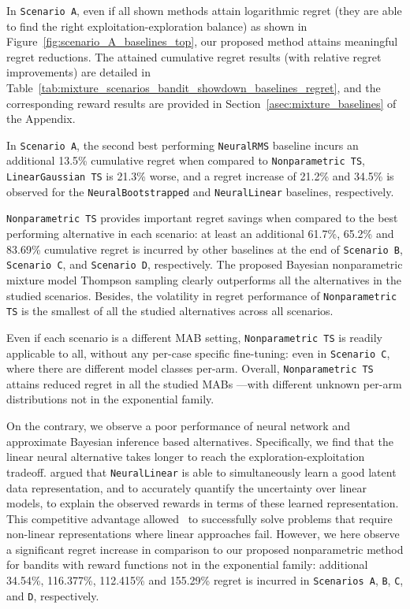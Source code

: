 In \texttt{Scenario A}, even if all shown methods attain logarithmic regret (\ie they are able to find the right exploitation-exploration balance) as shown in Figure~\ref{fig:scenario_A_baselines_top}, our proposed method attains meaningful regret reductions.
The attained cumulative regret results (with relative regret improvements) are detailed in Table~\ref{tab:mixture_scenarios_bandit_showdown_baselines_regret}, and the corresponding reward results are provided in Section~\ref{asec:mixture_baselines} of the Appendix.

In \texttt{Scenario A}, the second best performing \texttt{NeuralRMS} baseline incurs an additional 13.5\% cumulative regret when compared to \texttt{Nonparametric TS}, \texttt{LinearGaussian TS} is 21.3\% worse, and a regret increase of 21.2\% and 34.5\% is observed for the \texttt{NeuralBootstrapped} and \texttt{NeuralLinear} baselines, respectively.

\texttt{Nonparametric TS} provides important regret savings when compared to the best performing alternative in each scenario:
at least an additional 61.7\%, 65.2\% and 83.69\% cumulative regret is incurred by other baselines at the end of \texttt{Scenario B}, \texttt{Scenario C}, and \texttt{Scenario D}, respectively.
The proposed Bayesian nonparametric mixture model Thompson sampling clearly outperforms all the alternatives in the studied scenarios.
Besides, the volatility in regret performance of \texttt{Nonparametric TS} is the smallest of all the studied alternatives across all scenarios.

Even if each scenario is a different MAB setting, \texttt{Nonparametric TS} is readily applicable to all, without any per-case specific fine-tuning:
even in \texttt{Scenario C}, where there are different model classes per-arm.
Overall, \texttt{Nonparametric TS} attains reduced regret in all the studied MABs ---with different unknown per-arm distributions not in the exponential family.

On the contrary, we observe a poor performance of neural network and approximate Bayesian inference based alternatives.
Specifically, we find that the linear neural alternative takes longer to reach the exploration-exploitation tradeoff.
\citet{ip-Riquelme2018} argued that \texttt{NeuralLinear} is able to simultaneously learn a good latent data representation, and to accurately quantify the uncertainty over linear models, to explain the observed rewards in terms of these learned representation. This competitive advantage allowed~\citet{ip-Riquelme2018} to successfully solve problems that require non-linear representations where linear approaches fail. However, we here observe a significant regret increase in comparison to our proposed nonparametric method for bandits with reward functions not in the exponential family:
additional 34.54\%, 116.377\%, 112.415\% and 155.29\% regret is incurred in \texttt{Scenarios A}, \texttt{B}, \texttt{C}, and \texttt{D}, respectively.


